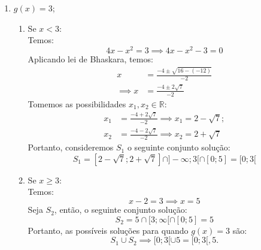 \documentclass[13pt,letterpaper]{article}
\begin{document}
\begin{enumerate}
\begin{enumerate}
\begin{enumerate}
            \end{enumerate}
        \item $g(x) = 3$;
            \begin{enumerate}
            \item Se $x < 3$: \\
                Temos:
                \begin{displaymath}
                    4x - x^2 = 3 \implies 4x - x^2 - 3 = 0 
                \end{displaymath}
                Aplicando lei de Bhaskara, temos:
                \begin{align*}
                    x &= \frac{-4 \pm \sqrt{16 - (-12)}}{-2} \\ \implies
                    x &= \frac{-4 \pm 2\sqrt{7}}{-2}
                \end{align*}
                Tomemos as possibilidades $x_1, x_2 \in \mathbb{R}$:
                \begin{align*}
                    x_1 &= \frac{-4 + 2\sqrt{7}}{-2} \implies x_1 = 2 - \sqrt{7} ; \\ 
                    x_2 &= \frac{-4 - 2\sqrt{7}}{-2} \implies x_2 = 2 + \sqrt{7}
                \end{align*}
                Portanto, consideremos $S_1$ o seguinte conjunto solução:
                \begin{displaymath}
                    S_1 = [2 - \sqrt{7}; 2 + \sqrt{7}] \cap ]-\infty; 3[ \cap [0; 5] = [0; 3[
                \end{displaymath}
            \item Se $x \ge 3$: \\
                Temos:
                \begin{displaymath}
                    x - 2 = 3 \implies x = 5
                \end{displaymath}
                Seja $S_2$, então, o seguinte conjunto solução:
                \begin{displaymath}
                    S_2 = 5 \cap [3; \infty[ \cap [0; 5] = 5
                \end{displaymath}
                Portanto, as possíveis soluções para quando $g(x) = 3$ são:
                \begin{displaymath}
                    S_1 \cup S_2 \implies [0; 3[ \cup 5 = {[0; 3[, 5}.
                \end{displaymath}
            \end{enumerate}

\end{enumerate}
\end{enumerate}
\end{document}
